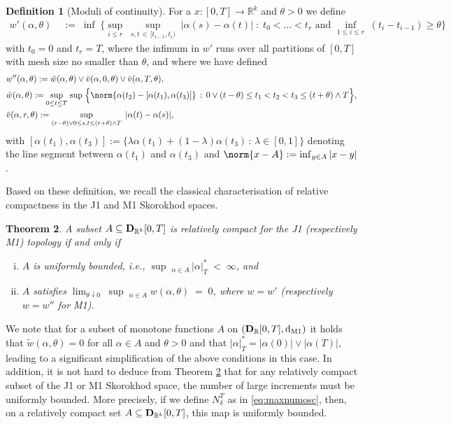 \documentclass[11pt]{article}
\newtheorem{theorem}{Theorem}[section]
\theoremstyle{definition}\newtheorem{example}[theorem]{Example}
\theoremstyle{definition}\newtheorem{counterexample}[theorem]{Counterexample}
\theoremstyle{definition}\newtheorem{remark}[theorem]{Remark}
\theoremstyle{definition}\newtheorem{defi}[theorem]{Definition}
\numberwithin{equation}{section}
\newcommand{\R}{\mathbb{R}}
\newcommand{\D}{{\bf D}}											%
\newcommand*\diff{\mathop{}\!\mathrm{d}}								%
\renewcommand{\sup}[1]{\underset{#1}{\operatorname{sup}}\;}					%
\renewcommand{\inf}[1]{\underset{#1}{\operatorname{inf}}\;}					%
\renewcommand{\|}{\; : \, \;}											%
\newcommand{\dM}{\diff_{\operatorname{M1}}}							%
\begin{document}
\begin{defi}[Moduli of continuity] \label{def:A7}
	For a $x: [0,T] \to \R^k$ and $\theta>0$ we define 
	\begin{align*}
		w'(\alpha, \theta) \; &:= \; \inf{} \biggl\{ \sup{i\le r} \sup{s,t \, \in \, [t_{i-1},t_{i})} |\alpha(s)-\alpha(t)|\; : \; t_0<...<t_r \text{ and } \inf{1\le i \le r}(t_i-t_{i-1})\ge \theta \biggr\}\end{align*}
	with $t_0=0$ and $t_r=T$, where the infimum in $w'$ runs over all partitions of $[0,T]$ with mesh size no smaller than $\theta$, and where we have defined
	\begin{align*}
		&w''(\alpha, \theta) :=  \tilde{w}(\alpha, \theta) \vee  \bar{v}(\alpha,0,\theta) \vee  \bar{v}(\alpha,T,\theta), \\
		&\tilde{w}(\alpha, \theta)  := \sup{0\le t \le T} \sup{} \Bigl\{  \norm{\alpha(t_2) - [ \alpha(t_1), \alpha(t_3)]} \, : \, 0\vee (t-\theta) \le t_1 < t_2 < t_3 \le (t+\theta) \wedge T \Bigr\},\\
		&\bar{v}(\alpha,r,\theta)  :=  \sup{(r-\theta) \vee 0 \le s,t \le (r+\theta) \wedge T} \, |\alpha(t)- \alpha(s)|,
	\end{align*}
	with $[ \alpha(t_1), \alpha(t_3)] := \{ \lambda \alpha(t_1)+(1-\lambda) \alpha(t_3) \, : \, \lambda \in [0,1]\}$ denoting the line segment between $\alpha(t_1)$ and $\alpha(t_3)$ and $\norm{x - A}:= \operatorname{inf}_{y \in A} |x-y|$.
\end{defi}
Based on these definition, we recall the classical characterisation of relative compactness in the J1 and M1 Skorokhod spaces.
\begin{theorem} \label{thm:A.8}
	A subset $A \subseteq \D_{\R^k} [0,T]$ is relatively compact for the J1 (respectively M1) topology if and only if 
	\begin{enumerate}[(i)]
		\item $A$ is uniformly bounded, i.e., $ \sup{}_{\!\alpha \in A} \, |\alpha|^*_T \; < \; \infty$, and\vspace{-8pt}
  \item $A$ satisfies  
		$\lim_{\theta \downarrow 0} \; \sup{}_{\!\alpha \in A} \; w (\alpha, \theta) \; = \; 0$, where $w=w'$ (respectively $w=w''$ for M1).
	\end{enumerate}
\end{theorem}
We note that for a subset of monotone functions $A$ on $(\D_\R[0,T], \dM)$ it holds that $\tilde w(\alpha, \theta)=0$ for all $\alpha \in A$ and $\theta>0$ and that $|\alpha|^*_T= |\alpha(0)| \vee |\alpha(T)|$, leading to a significant simplification of the above conditions in this case. In addition, it is not hard to deduce from Theorem \ref{thm:A.8} that for any relatively compact subset of the J1 or M1 Skorokhod space, the number of large increments must be uniformly bounded. More precisely, if we define $N_\delta^T$ as in \eqref{eq:maxnumosc}, then, on a relatively compact set $A\subseteq \D_{\R^k}[0,T]$, this map is uniformly bounded.
\end{document}
